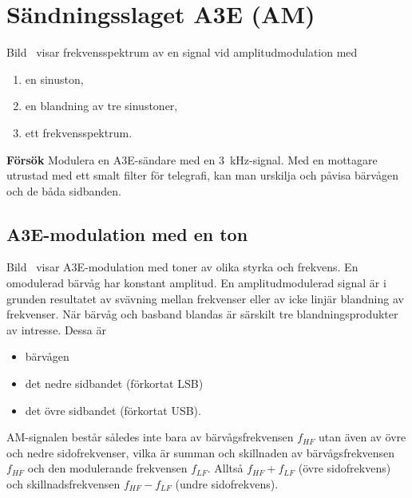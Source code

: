 \section{Sändningsslaget A3E (AM)}
\label{modulation_am}


Bild~ visar frekvensspektrum av en signal vid
amplitudmodulation med

\begin{enumerate}[label=\alph*.,noitemsep]
\item en sinuston,
\item en blandning av tre sinustoner,
\item ett frekvensspektrum.
\end{enumerate}

\noindent\textbf{Försök}
%
Modulera en A3E-sändare med en \qty{3}{\kilo\hertz}-signal.
Med en mottagare utrustad med ett smalt filter för telegrafi, kan man urskilja
och påvisa bärvågen och de båda sidbanden.

\subsection{A3E-modulation med en ton}


Bild~ visar A3E-modulation med toner av olika styrka och
frekvens.
En omodulerad bärvåg har konstant amplitud.
En amplitudmodulerad signal är i grunden resultatet av svävning mellan
frekvenser eller av icke linjär blandning av frekvenser.
När bärvåg och basband blandas är särskilt tre blandningsprodukter av intresse.
Dessa är
\begin{itemize}
\item bärvågen
\item det nedre sidbandet (förkortat LSB)
\item det övre sidbandet (förkortat USB).
\end{itemize}

AM-signalen består således inte bara av bärvågsfrekvensen \(f_{HF}\) utan även
av övre och nedre sidofrekvenser, vilka är summan och skillnaden av
bärvågsfrekvensen \(f_{HF}\) och den modulerande frekvensen \(f_{LF}\).
Alltså \(f_{HF} + f_{LF}\) (övre sidofrekvens) och skillnadsfrekvensen
\(f_{HF} - f_{LF}\) (undre sidofrekvens).


